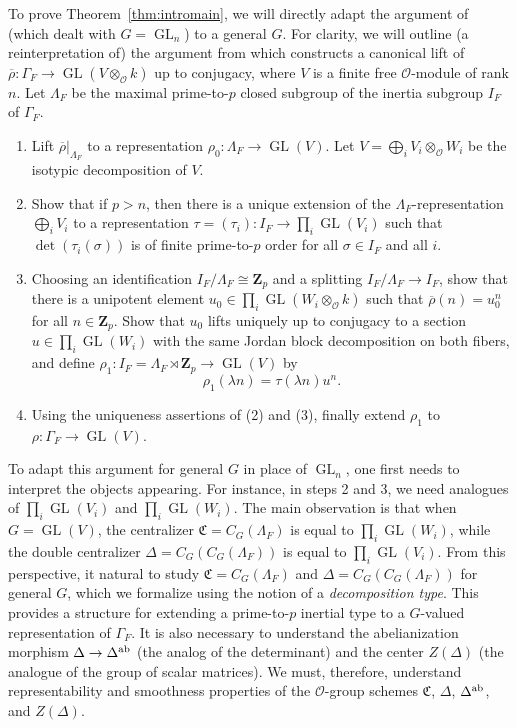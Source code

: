 \documentclass[11pt, letterpaper,english]{amsart}
\theoremstyle{plain}
\theoremstyle{definition}
\numberwithin{equation}{section}
\numberwithin{lem}{section}
\newcommand{\mathfont}{\mathbf}
\newcommand{\fC}{\mathfrak{C}}
\newcommand{\bZ}{\mathfont{Z}}
\newcommand{\cO}{\mathcal{O}}
\newcommand{\rhobar}{{\overline{\rho}}}
\DeclareMathOperator{\GL}{GL}
\begin{document}
To prove Theorem~\ref{thm:intromain}, we will directly adapt the argument of \cite{cht08} (which dealt with $G = \GL_n$) to a general $G$. For clarity, we will outline (a reinterpretation of) the argument from \cite{cht08} which constructs a canonical lift of $\rhobar: \Gamma_F \to \GL(V \otimes_{\cO} k)$ up to conjugacy, where $V$ is a finite free $\cO$-module of rank $n$. Let $\Lambda_F$ be the maximal prime-to-$p$ closed subgroup of the inertia subgroup $I_F$ of $\Gamma_F$.
\begin{enumerate}
    \item Lift $\rhobar|_{\Lambda_F}$ to a representation $\rho_0: \Lambda_F \to \GL(V)$. Let $V = \bigoplus_i V_i \otimes_{\cO} W_i$ be the isotypic decomposition of $V$.
    \item Show that if $p > n$, then there is a unique extension of the $\Lambda_F$-representation $\bigoplus_i V_i$ to a representation $\tau = (\tau_i): I_F \to \prod_i \GL(V_i)$ such that $\det(\tau_i(\sigma))$ is of finite prime-to-$p$ order for all $\sigma \in I_F$ and all $i$.
    \item Choosing an identification $I_F/\Lambda_F \cong \bZ_p$ and a splitting $I_F/\Lambda_F \to I_F$, show that there is a unipotent element $u_0 \in \prod_i \GL(W_i \otimes_{\cO} k)$ such that $\rhobar(n) = u_0^n$ for all $n \in \bZ_p$. Show that $u_0$ lifts uniquely up to conjugacy to a section $u \in \prod_i \GL(W_i)$ with the same Jordan block decomposition on both fibers, and define $\rho_1: I_F = \Lambda_F \rtimes \bZ_p \to \GL(V)$ by
    \[
    \rho_1(\lambda n) = \tau(\lambda n) u^n.
    \]
    \item Using the uniqueness assertions of (2) and (3), finally extend $\rho_1$ to $\rho: \Gamma_F \to \GL(V)$.
\end{enumerate}
To adapt this argument for general $G$ in place of $\GL_n$, one first needs to interpret the objects appearing. For instance, in steps 2 and 3, we need analogues of $\prod_i \GL(V_i)$ and $\prod_i \GL(W_i)$. The main observation is that when $G = \GL(V)$, the centralizer $\fC = C_G(\Lambda_F)$ is equal to $\prod_i \GL(W_i)$, while the double centralizer $\Delta = C_G(C_G(\Lambda_F))$ is equal to $\prod_i \GL(V_i)$.   
From this perspective, it natural to study $\fC = C_G(\Lambda_F)$ and $\Delta = C_G(C_G(\Lambda_F))$ for general $G$, which we formalize using the notion of a \emph{decomposition type}.  This provides a structure for extending a prime-to-$p$ inertial type to a $G$-valued representation of $\Gamma_F$.
 It is also necessary to understand the abelianization morphism $\Delta \to \Delta^{\rm{ab}}$ (the analog of the determinant) and the center $Z(\Delta)$ (the analogue of the group of scalar matrices).  We must, therefore, understand representability and smoothness properties of the $\cO$-group schemes $\fC$, $\Delta$, $\Delta^{\rm{ab}}$, and $Z(\Delta)$.
\end{document}
